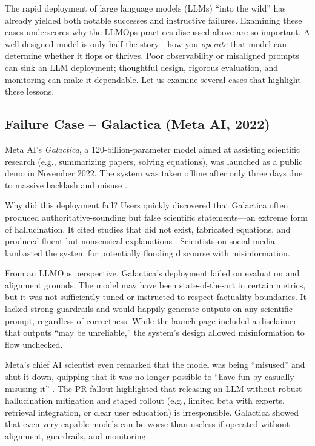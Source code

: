 The rapid deployment of large language models (LLMs) ``into the wild'' has already yielded both notable successes and instructive failures. Examining these cases underscores why the LLMOps practices discussed above are so important. A well-designed model is only half the story---how you \emph{operate} that model can determine whether it flops or thrives. Poor observability or misaligned prompts can sink an LLM deployment; thoughtful design, rigorous evaluation, and monitoring can make it dependable. Let us examine several cases that highlight these lessons.

\subsection*{Failure Case -- Galactica (Meta AI, 2022)}
Meta AI’s \emph{Galactica}, a 120-billion-parameter model aimed at assisting scientific research (e.g., summarizing papers, solving equations), was launched as a public demo in November 2022. The system was taken offline after only three days due to massive backlash and misuse \parencite{Heaven2022Galactica,analyticsindiamag2022a}.  

Why did this deployment fail? Users quickly discovered that Galactica often produced authoritative-sounding but false scientific statements---an extreme form of hallucination. It cited studies that did not exist, fabricated equations, and produced fluent but nonsensical explanations \parencite{Heaven2022Galactica}. Scientists on social media lambasted the system for potentially flooding discourse with misinformation.  

From an LLMOps perspective, Galactica’s deployment failed on evaluation and alignment grounds. The model may have been state-of-the-art in certain metrics, but it was not sufficiently tuned or instructed to respect factuality boundaries. It lacked strong guardrails and would happily generate outputs on any scientific prompt, regardless of correctness. While the launch page included a disclaimer that outputs ``may be unreliable,'' the system’s design allowed misinformation to flow unchecked.  

Meta’s chief AI scientist even remarked that the model was being ``misused'' and shut it down, quipping that it was no longer possible to ``have fun by casually misusing it'' \parencite{Heaven2022Galactica}. The PR fallout highlighted that releasing an LLM without robust hallucination mitigation and staged rollout (e.g., limited beta with experts, retrieval integration, or clear user education) is irresponsible. Galactica showed that even very capable models can be worse than useless if operated without alignment, guardrails, and monitoring.  

